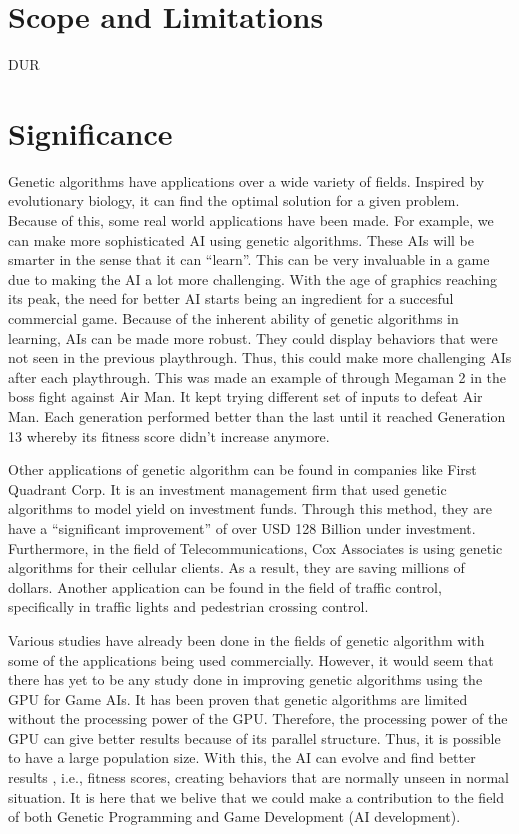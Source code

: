\section{Scope and Limitations}

DUR

\section{Significance}

Genetic algorithms have applications over a wide variety of fields.
Inspired by evolutionary biology, it can find the optimal solution
for a given problem.  Because of this, some real world applications
have been made.  For example, we can make more sophisticated AI using 
genetic algorithms.  These AIs will be smarter in the sense that it can ``learn''.  
This can be very invaluable in a game due to making the AI a lot more challenging.  
With the age of graphics reaching its peak, the need for better AI starts being an
ingredient for a succesful commercial game\cite{Yue06}.  Because of the inherent ability
of genetic algorithms in learning, AIs can be made more robust.  They could 
display behaviors that were not seen in the previous playthrough.  Thus, 
this could make more challenging AIs after each playthrough.  This was made an 
example of through Megaman 2 in the boss fight against Air Man.  It kept trying different 
set of inputs to defeat Air Man.  Each generation performed better than the last 
until it reached Generation 13 whereby its fitness score didn't increase anymore\cite{website:Kuliniewicz09}.  


Other applications of genetic algorithm can be found in companies like First Quadrant Corp.
It is an investment management firm that used genetic algorithms to model yield on 
investment funds\cite{website:Davis}.  Through this method, they are have a ``significant improvement''
of over USD 128 Billion under investment\cite{website:Davis}.  Furthermore, in the field of Telecommunications, 
Cox Associates is using genetic algorithms for their cellular clients\cite{website:Davis}.  
As a result, they are saving millions of dollars.  Another application can be found 
in the field of traffic control, specifically in traffic lights and pedestrian crossing
control\cite{Turky09}.  

Various studies have already been done in the fields of genetic algorithm with some of the applications
being used commercially.
However, it would seem that there has yet to be any study done in improving genetic algorithms
using the GPU for Game AIs.  It has been proven that genetic algorithms are limited without
the processing power of the GPU\cite{Banzhaf09}.  Therefore, the processing power of the GPU can give better 
results because of its parallel structure.  Thus, it is possible to have a large population size.
With this, the AI can evolve and find better results , i.e., fitness scores, creating behaviors that are normally
unseen in normal situation.  It is here that we belive that we 
could make a contribution to the field of both Genetic Programming and Game Development (AI development).